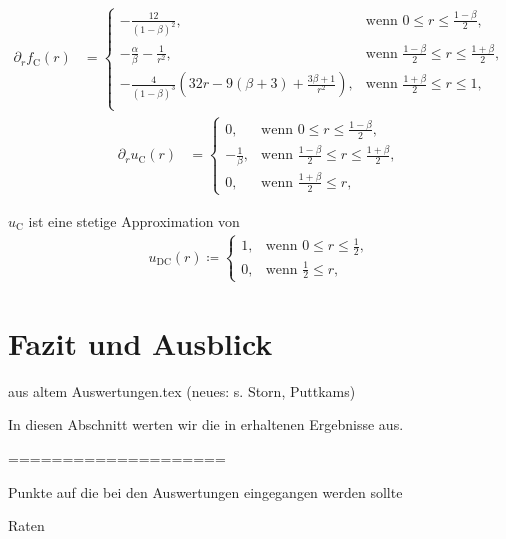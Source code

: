 \begin{align*}
  \partial_r f_\textrm{C}(r) &= 
  \begin{cases}
    -\frac{12}{(1-\beta)^2},&\text{wenn }0\leq r\leq\frac{1-\beta}{2},\\
    -\frac{\alpha}{\beta}-\frac{1}{r^2},&
    \text{wenn } \frac{1-\beta}{2}\leq r\leq \frac{1+\beta}{2},\\
    -\frac{4}{(1-\beta)^3}\left( 32r-9(\beta+3)+\frac{3\beta+1}{r^2} \right),&
    \text{wenn } \frac{1+\beta}{2}\leq r\leq 1,\\
  \end{cases}
\end{align*}
\begin{align*}
  \partial_r u_\textrm{C}(r) &= 
  \begin{cases}
    0,&\text{wenn }0\leq r\leq\frac{1-\beta}{2},\\
    -\frac{1}{\beta},&
    \text{wenn } \frac{1-\beta}{2}\leq r\leq \frac{1+\beta}{2},\\
    0,&\text{wenn } \frac{1+\beta}{2}\leq r,
  \end{cases}
\end{align*}

$u_\textrm{C}$ ist eine stetige Approximation von
\begin{align*}
  u_\textrm{DC}(r)\coloneqq 
  \begin{cases}
    1, & \text{wenn } 0\leq r\leq\frac{1}{2},\\
    0, & \text{wenn } \frac{1}{2}\leq r,
  \end{cases}
\end{align*}

\section{Fazit und Ausblick}

aus altem Auswertungen.tex (neues: s. Storn, Puttkams)

In diesen Abschnitt werten wir die in  erhaltenen
Ergebnisse aus.



====================

Punkte auf die bei den Auswertungen eingegangen werden sollte

Raten

